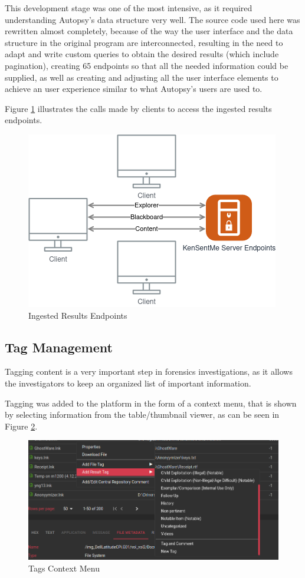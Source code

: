 This development stage was one of the most intensive, as it required understanding Autopsy's data structure very well. The source code used here was rewritten almost completely, 
because of the way the user interface and the data structure in the original program are interconnected, resulting in the need to adapt and write custom queries to obtain the desired results (which include pagination), creating 
65 endpoints so that all the needed information could be supplied, as well as creating and adjusting all the user interface elements to achieve an user experience similar to what Autopsy's users are used to.

Figure \ref{fig:endpoints} illustrates the calls made by clients to access the ingested results endpoints.

\begin{figure}[ht]
 \centering
 \includegraphics[width=0.5\linewidth]{imgs/endpoints.png}
 \caption{Ingested Results Endpoints}
 \label{fig:endpoints}
\end{figure}

\subsection{Tag Management}

Tagging content is a very important step in forensics investigations, as it allows the investigators to keep an organized list of important information.

Tagging was added to the platform in the form of a context menu, that is shown by selecting information from the table/thumbnail viewer, as can be seen in Figure \ref{fig:tags}.

\begin{figure}[ht]
 \centering
 \includegraphics[width=1\linewidth]{imgs/tags.png}
 \caption{Tags Context Menu}
 \label{fig:tags}
\end{figure}

